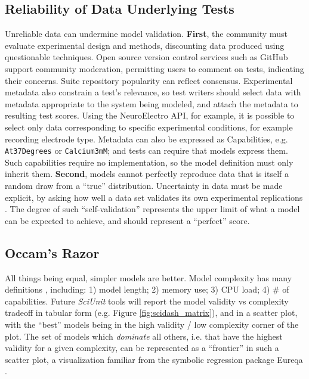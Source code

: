 \documentclass{frontiersSCNS}
\let\verbx\lstinline
\begin{document}
\subsection{Reliability of Data Underlying Tests}
Unreliable data can undermine model validation. 
\textbf{First}, the community must evaluate experimental design and methods, discounting data produced using questionable techniques. 
Open source version control services such as GitHub support community moderation, permitting users to comment on tests, indicating their concerns. 
Suite repository popularity can reflect consensus. 
Experimental metadata also constrain a test's relevance, so test writers should select data with metadata appropriate to the system being modeled, and attach the metadata to resulting test scores. 
Using the NeuroElectro API, for example, it is possible to select only data corresponding to specific experimental conditions, for example recording electrode type.  
Metadata can also be expressed as Capabilities, e.g. \verbx{At37Degrees} or \verbx{Calcium3mM}; and tests can require that models express them. 
Such capabilities require no implementation, so the model definition must only inherit them. 
\textbf{Second}, models cannot perfectly reproduce data that is itself a random draw from a ``true'' distribution. 
Uncertainty in data must be made explicit, by asking how well a data set validates its own experimental replications \citep{kriegeskorte_representational_2008}. 
The degree of such ``self-validation'' represents the upper limit of what a model can be expected to achieve, and should represent a ``perfect'' score.  

\subsection{Occam's Razor}
All things being equal, simpler models are better. 
Model complexity has many definitions \citep{mccabe_complexity_1976}, including: 
1) model length; 2) memory use; 3) CPU load; 4) \# of capabilities. 
Future \textit{SciUnit} tools will report the model validity vs complexity tradeoff in tabular form (e.g. Figure \ref{fig:scidash_matrix}), and in a scatter plot, with the ``best'' models being in the high validity / low complexity corner of the plot. 
The set of models which \textit{dominate} all others, i.e. that have the highest validity for a given complexity, can be represented as a ``frontier'' in such a scatter plot, a visualization familiar from the symbolic regression package Eureqa \citep{schmidt_distilling_2009}.  
\end{document}
